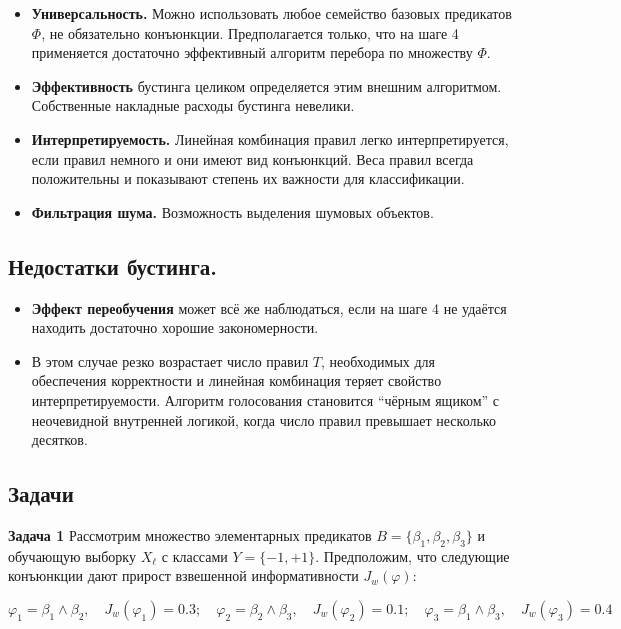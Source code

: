 \begin{itemize}
\begin{itemize}
    \item \textbf{Универсальность.} Можно использовать любое семейство базовых предикатов $\Phi$, не обязательно конъюнкции. Предполагается только, что на шаге 4 применяется достаточно эффективный алгоритм перебора по множеству $\Phi$.

    \item \textbf{Эффективность} бустинга целиком определяется этим внешним алгоритмом. Собственные накладные расходы бустинга невелики.

    \item \textbf{Интерпретируемость.} Линейная комбинация правил легко интерпретируется, если правил немного и они имеют вид конъюнкций. Веса правил всегда положительны и показывают степень их важности для классификации.

    \item \textbf{Фильтрация шума.} Возможность выделения шумовых объектов.
\end{itemize}

\subsection*{Недостатки бустинга.}

\begin{itemize}
    \item \textbf{Эффект переобучения} может всё же наблюдаться, если на шаге 4 не удаётся находить достаточно хорошие закономерности.

    \item В этом случае резко возрастает число правил $T$, необходимых для обеспечения корректности и линейная комбинация теряет свойство интерпретируемости. Алгоритм голосования становится ``чёрным ящиком'' с неочевидной внутренней логикой, когда число правил превышает несколько десятков.
\end{itemize}

\subsection{Задачи}

\textbf{Задача 1}  
Рассмотрим множество элементарных предикатов \( B = \{ \beta_1, \beta_2, \beta_3 \} \) и обучающую выборку \( X_\ell \) с классами \( Y = \{-1, +1\} \). Предположим, что следующие конъюнкции дают прирост взвешенной информативности \( J_w(\varphi) \):

\[
\varphi_1 = \beta_1 \wedge \beta_2, \quad J_w(\varphi_1) = 0.3; \quad
\varphi_2 = \beta_2 \wedge \beta_3, \quad J_w(\varphi_2) = 0.1; \quad
\varphi_3 = \beta_1 \wedge \beta_3, \quad J_w(\varphi_3) = 0.4
\]


\end{itemize}

